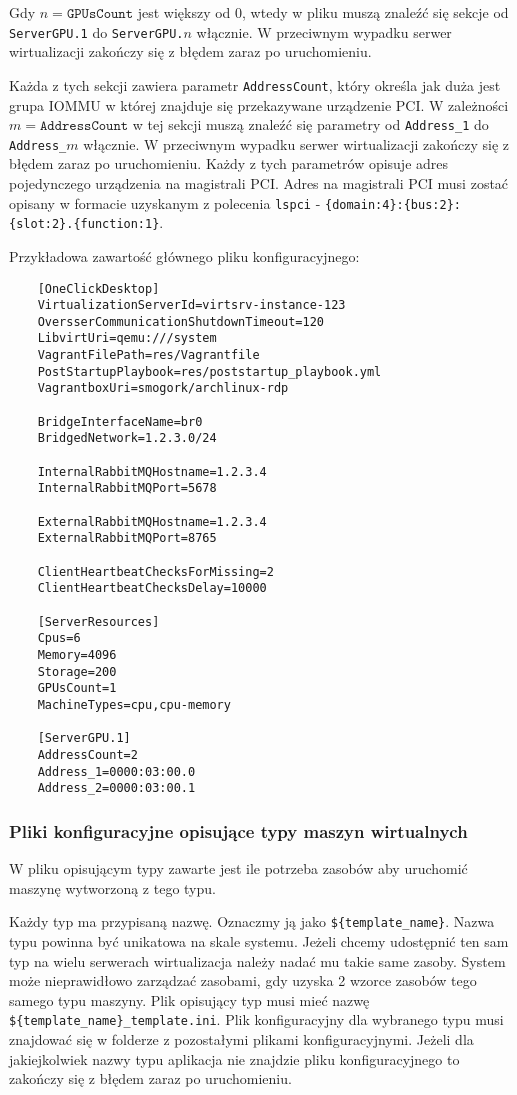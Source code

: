 \documentclass[../opis-rozwiazania.tex]{subfiles}
\begin{document}
Gdy $n = \texttt{GPUsCount}$ jest większy od 0, wtedy w pliku muszą znaleźć się sekcje od \texttt{ServerGPU.1} do \texttt{ServerGPU.$n$} włącznie.
W przeciwnym wypadku serwer wirtualizacji zakończy się z błędem zaraz po uruchomieniu.

Każda z tych sekcji zawiera parametr \texttt{AddressCount}, który określa jak duża jest grupa IOMMU w której znajduje się przekazywane urządzenie PCI.
W zależności $m = \texttt{AddressCount}$ w tej sekcji muszą znaleźć się parametry od \texttt{Address\_1} do \texttt{Address\_$m$} włącznie.
W przeciwnym wypadku serwer wirtualizacji zakończy się z błędem zaraz po uruchomieniu.
Każdy z tych parametrów opisuje adres pojedynczego urządzenia na magistrali PCI.
Adres na magistrali PCI musi zostać opisany w formacie uzyskanym z polecenia \texttt{lspci} - \texttt{\{domain:4\}:\{bus:2\}:\{slot:2\}.\{function:1\}}.

Przykładowa zawartość głównego pliku konfiguracyjnego:
\begin{verbatim}
	[OneClickDesktop]
	VirtualizationServerId=virtsrv-instance-123
	OversserCommunicationShutdownTimeout=120
	LibvirtUri=qemu:///system
	VagrantFilePath=res/Vagrantfile
	PostStartupPlaybook=res/poststartup_playbook.yml
	VagrantboxUri=smogork/archlinux-rdp

	BridgeInterfaceName=br0
	BridgedNetwork=1.2.3.0/24

	InternalRabbitMQHostname=1.2.3.4
	InternalRabbitMQPort=5678

	ExternalRabbitMQHostname=1.2.3.4
	ExternalRabbitMQPort=8765

	ClientHeartbeatChecksForMissing=2
	ClientHeartbeatChecksDelay=10000

	[ServerResources]
	Cpus=6
	Memory=4096
	Storage=200
	GPUsCount=1
	MachineTypes=cpu,cpu-memory

	[ServerGPU.1]
	AddressCount=2
	Address_1=0000:03:00.0
	Address_2=0000:03:00.1
\end{verbatim}

\subsubsection{Pliki konfiguracyjne opisujące typy maszyn wirtualnych}
W pliku opisującym typy zawarte jest ile potrzeba zasobów aby uruchomić maszynę wytworzoną z tego typu.

Każdy typ ma przypisaną nazwę. Oznaczmy ją jako \texttt{\$\{template\_name\}}.
Nazwa typu powinna być unikatowa na skale systemu.
Jeżeli chcemy udostępnić ten sam typ na wielu serwerach wirtualizacja należy nadać mu takie same zasoby.
System może nieprawidłowo zarządzać zasobami, gdy uzyska 2 wzorce zasobów tego samego typu maszyny.
Plik opisujący typ musi mieć nazwę \texttt{\$\{template\_name\}\_template.ini}.
Plik konfiguracyjny dla wybranego typu musi znajdować się w folderze z pozostałymi plikami konfiguracyjnymi.
Jeżeli dla jakiejkolwiek nazwy typu aplikacja nie znajdzie pliku konfiguracyjnego to zakończy się z błędem zaraz po uruchomieniu.
\end{document}
